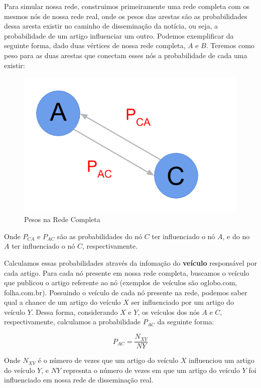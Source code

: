 \documentclass[a4paper,12pt]{article}
\begin{document}
 Para simular nossa rede, construimos primeiramente uma rede completa com os mesmos nós de nossa rede real, onde os pesos das arestas
 são as probabilidades dessa aresta existir no caminho de disseminação da notícia, ou seja, a probabilidade de um artigo influenciar um 
 outro. Podemos exemplificar da seguinte forma, dado duas vértices de nossa rede completa, $A$ e $B$. Teremos como peso para as duas 
 arestas que conectam esses nós a probabilidade de cada uma existir:
 
 \begin{figure}[ht]
 \centering
 \includegraphics[scale=0.3]{./rede5.png}
 \caption{Pesos na Rede Completa}
\end{figure}

 Onde $P_{CA}$ e $P_{AC}$ são as probabilidades do nó $C$ ter influenciado o nó $A$, e do no $A$ ter influenciado o nó $C$, 
 respectivamente.

 Calculamos essas probabilidades através da infomação do \textbf{veículo} responsável por cada artigo. Para cada nó presente em nossa rede completa,
 buscamos o veículo que publicou o artigo referente ao nó (exemplos de veículos são oglobo.com, folha.com.br). Possuindo o veículo de cada
 nó presente na rede, podemos saber qual a chance de um artigo do veículo $X$ ser influenciado por um artigo do veículo $Y$. Dessa forma, 
 considerando $X$ e $Y$, os veículos dos nós $A$ e $C$, respectivamente, calculamos a probabilidade $P_{AC}$ da seguinte forma:
 
 \begin{equation}
  P_{AC} = \dfrac{N_{XY}}{NY}
 \end{equation}

 
 Onde  $N_{XY}$ é o número de vezes que um artigo do veículo $X$ influenciou um artigo do veículo $Y$, e $NY$ represnta o número de vezes
 em que um artigo do veículo $Y$ foi influenciado em nossa rede de disseminação real.
\end{document}
